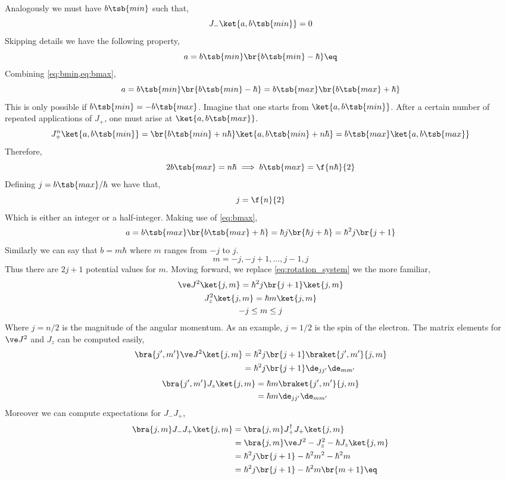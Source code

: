 \documentclass{article}
\begin{document}
Analogously we must have $b\tsb{min}$ such that,
\[ J_- \ket{a, b\tsb{min}} = 0 \]
Skipping details we have the following property,
\[ a = b\tsb{min}\br{b\tsb{min} - \hbar} \eq \label{eq:bmin}\]
Combining \cref{eq:bmin,eq:bmax},
\[ a = b\tsb{min}\br{b\tsb{min} - \hbar} = b\tsb{max}\br{b\tsb{max} + \hbar} \]
This is only possible if $b\tsb{min} = -b\tsb{max}$. Imagine that one starts from $\ket{a, b\tsb{min}}$. After a certain number of repeated applications of $J_+$, one must arise at $\ket{a, b\tsb{max}}$.
\[ J_+^{n} \ket{a, b\tsb{min}} = \br{b\tsb{min} + n\hbar} \ket{a, b\tsb{min}+ n\hbar} = b\tsb{max}\ket{a, b\tsb{max}} \]
Therefore,
\[ 2 b\tsb{max} = n \hbar \implies b\tsb{max} = \f{n\hbar}{2} \]
Defining $j = b\tsb{max} / \hbar$ we have that,
\[ j = \f{n}{2} \]
Which is either an integer or a half-integer. Making use of \cref{eq:bmax},
\[ a = b\tsb{max}\br{b\tsb{max} + \hbar} = \hbar j \br{\hbar j + \hbar} = \hbar^2 j\br{j+1} \]
Similarly we can say that $b = m \hbar$ where $m$ ranges from $-j$ to $j$.
\[  m = -j, -j +1, \ldots, j-1, j \]
Thus there are $2j+1$ potential values for $m$. Moving forward, we replace \cref{eq:rotation_system} we the more familiar,
\begin{gather*}
    \ve J^2 \ket{j,m} = \hbar^2 j \br{j+1} \ket{j,m}\\
    J_z^2 \ket{j,m} = \hbar m \ket{j,m}\\
    -j \leq m \leq j
\end{gather*}
Where $j = n/2$ is the magnitude of the angular momentum. As an example, $j = 1/2$ is the spin of the electron. The matrix elements for $\ve J^2$ and $J_z$ can be computed easily,
\begin{align*}
    \bra{j', m'} \ve J^2 \ket{j,m}
    &= \hbar^2 j \br{j+1} \braket{j', m'}{j,m} \\
    &= \hbar^2 j \br{j+1} \de_{jj'}\de_{mm'}
\end{align*}
\begin{align*}
    \bra{j', m'} J_z \ket{j,m}
    &= \hbar m \braket{j', m'}{j,m} \\
    &= \hbar m \de_{jj'}\de_{mm'}
\end{align*}
Moreover we can compute expectations for $J_-J_+$,
\begin{align*}
    \bra{j,m}J_-J_+\ket{j,m}
    &= \bra{j,m}J_+^{\dagger}J_+\ket{j,m} \\
    &= \bra{j,m}\ve J^2 - J_z^2 - \hbar J_z\ket{j,m} \\
    &= \hbar^2 j \br{j+1} - \hbar^2 m^2 - \hbar^2 m \\
    &= \hbar^2 j \br{j+1} - \hbar^2 m\br{m+1} \eq \label{eq:jmpexp}
\end{align*}
\end{document}
